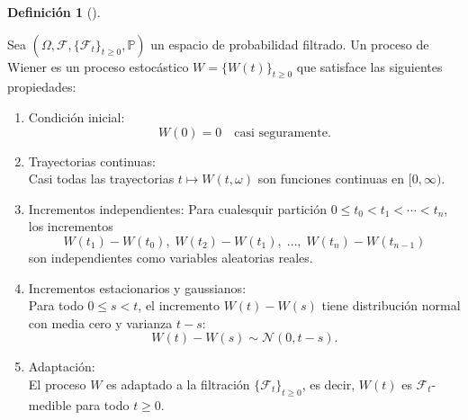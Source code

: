 \documentclass[
  spanish,
  us-letterpaper,
]{scrreprt}
\theoremstyle{plain}
\theoremstyle{plain}
\theoremstyle{definition}
\newtheorem{definition}{Definición}[chapter]
\theoremstyle{remark}
\begin{document}
\begin{definition}[]\protect\hypertarget{def-Proceso_Wiener}{}\label{def-Proceso_Wiener}

Sea \((\Omega, \mathcal{F}, \{\mathcal{F}_t\}_{t \geq 0}, \mathbb{P})\)
un espacio de probabilidad filtrado. Un proceso de Wiener es un proceso
estocástico \(W = \{W(t)\}_{t \geq 0}\) que satisface las siguientes
propiedades:

\begin{enumerate}
\def\labelenumi{\arabic{enumi}.}
\item
  Condición inicial:\\
  \[ W(0) = 0 \quad \text{casi seguramente}.\]
\item
  Trayectorias continuas:\\
  Casi todas las trayectorias \(t \mapsto W(t,\omega)\) son funciones
  continuas en \([0, \infty)\).
\item
  Incrementos independientes: Para cualesquir partición
  \(0 \leq t_0 < t_1 < \cdots < t_n\), los incrementos\\
  \[W(t_1) - W(t_0), \; W(t_2) - W(t_1), \; \dots, \; W(t_n) - W(t_{n-1})\]
  son independientes como variables aleatorias reales.
\item
  Incrementos estacionarios y gaussianos:\\
  Para todo \(0 \leq s < t\), el incremento \(W(t) - W(s)\) tiene
  distribución normal con media cero y varianza \(t - s\):\\
  \[W(t) - W(s) \sim \mathcal{N}(0, t - s).\]
\item
  Adaptación:\\
  El proceso \(W\) es adaptado a la filtración
  \(\{\mathcal{F}_t\}_{t \geq 0}\), es decir, \(W(t)\) es
  \(\mathcal{F}_t\)-medible para todo \(t \geq 0\).
\end{enumerate}

\end{definition}
\end{document}
